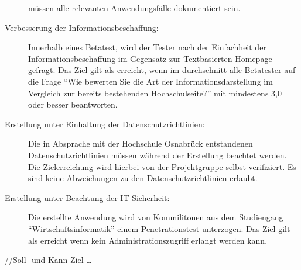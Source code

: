 \begin{description}
	müssen alle relevanten Anwendungsfälle dokumentiert sein.
	\item[Verbesserung der Informationsbeschaffung:] Innerhalb eines Betatest, wird
	der Tester nach der Einfachheit der Informationsbeschaffung im
	Gegensatz zur Textbasierten Homepage gefragt. Das Ziel gilt als erreicht, wenn
	im durchschnitt alle Betatester auf die Frage "`Wie bewerten Sie die Art der
	Informationsdarstellung im Vergleich zur bereits bestehenden Hochschulseite?"'
	mit mindestens 3,0 oder besser beantworten.
	\item[Erstellung unter Einhaltung der Datenschutzrichtlinien:] Die in Absprache
	mit der Hochschule Osnabrück entstandenen Datenschutzrichtlinien müssen während
	der Erstellung beachtet werden. Die Zielerreichung wird hierbei von der
	Projektgruppe selbst verifiziert. Es sind keine Abweichungen zu den
	Datenschutzrichtlinien erlaubt.
	\item[Erstellung unter Beachtung der IT-Sicherheit:] Die erstellte Anwendung
	wird von Kommilitonen aus dem Studiengang "`Wirtschaftsinformatik"' einem
	Penetrationstest unterzogen. Das Ziel gilt als erreicht wenn kein
	Administrationszugriff erlangt werden kann. 
\end{description}

//Soll- und Kann-Ziel \ldots











